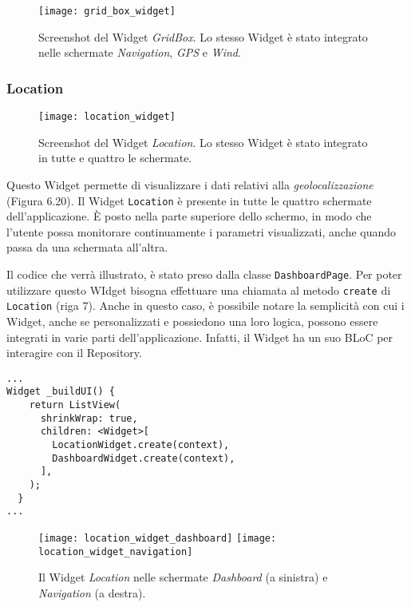 \begin{figure}
	\begin{center}
		\texttt{[image: grid\_box\_widget]}
		\caption[Screenshot - GridBox Widget]{Screenshot del Widget \textit{GridBox}. Lo stesso Widget è stato integrato nelle schermate \textit{Navigation}, \textit{GPS} e \textit{Wind}.}
		\label{figura:grid_box_widget}
	\end{center}
\end{figure}

\subsubsection{Location}
\begin{figure}
	\begin{center}
		\texttt{[image: location\_widget]}
		\caption[Screenshot - Location Widget]{Screenshot del Widget \textit{Location}. Lo stesso Widget è stato integrato in tutte e quattro le schermate.}
		\label{figura:location_widget}
	\end{center}
\end{figure}

Questo Widget permette di visualizzare i dati relativi alla \textit{geolocalizzazione} (Figura 6.20). Il Widget \verb|Location| è presente in tutte le quattro schermate dell'applicazione. È posto nella parte superiore dello schermo, in modo che l'utente possa monitorare continuamente i parametri visualizzati, anche quando passa da una schermata all'altra.

Il codice che verrà illustrato, è stato preso dalla classe \verb|DashboardPage|. Per poter utilizzare questo WIdget bisogna effettuare una chiamata al metodo \verb|create| di \verb|Location| (riga 7). Anche in questo caso, è possibile notare la semplicità con cui i Widget, anche se personalizzati e possiedono una loro logica, possono essere integrati in varie parti dell'applicazione. Infatti, il Widget ha un suo BLoC per interagire con il Repository.

\newpage

\begin{lstlisting}
...
Widget _buildUI() {
    return ListView(
      shrinkWrap: true,
      children: <Widget>[
        LocationWidget.create(context),
        DashboardWidget.create(context),
      ],
    );
  }
...
\end{lstlisting}

\begin{figure}[htp]
	\centering
	\texttt{[image: location\_widget\_dashboard]}
	\texttt{[image: location\_widget\_navigation]}
	\caption[Screenshot - Location Widget nelle schermate Dashboard e Navigation]{Il Widget \textit{Location} nelle schermate \textit{Dashboard} (a sinistra) e \textit{Navigation} (a destra).}\label{xyz}
\end{figure}


